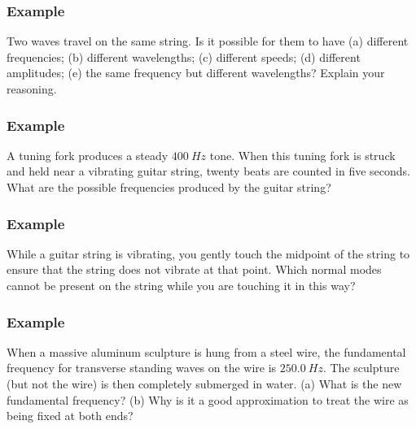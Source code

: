 \documentclass[]{beamer}
\begin{document}


  \begin{frame}
    \frametitle{Example \theexample}
    Two waves travel on the same string. Is it possible for them
    to have (a) different frequencies; (b) different wavelengths; (c) different
    speeds; (d) different amplitudes; (e) the same frequency but
    different wavelengths? Explain your reasoning.
  
  \end{frame}
  \begin{frame}
  \frametitle{Example \theexample}
  
  A tuning fork produces a steady $400~Hz$ tone. When this
  tuning fork is struck and held near a vibrating guitar string, twenty beats are counted
  in five seconds. What are the possible frequencies produced by the guitar string?
  
    \end{frame}
  
     
  \begin{frame}
    \frametitle{Example \theexample} 
    While a guitar string is vibrating,
you gently touch the midpoint of the string to ensure that the string does not vibrate at
that point. Which normal modes cannot be present on the string while you are touching it
in this way?
\end{frame}





  \begin{frame}
    \frametitle{Example \theexample} 


  When a massive aluminum sculpture is hung from a
steel wire, the fundamental frequency for transverse standing
waves on the wire is $250.0~ Hz$. The sculpture (but not the wire) is
then completely submerged in water. (a) What is the new fundamental
frequency?  (b) Why is it a good
approximation to treat the wire as being fixed at both ends?

\end{frame}
\end{document}
